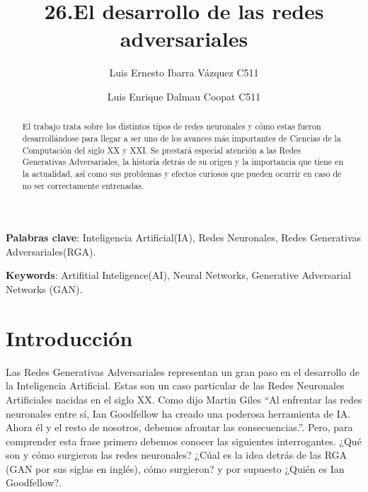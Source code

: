 \documentclass[a4paper]{article}
\begin{document}
\title{26.El desarrollo de las redes adversariales}
\author{Luis Ernesto Ibarra Vázquez C511\and
Luis Enrique Dalmau Coopat C511}
%
%
\renewcommand{\refname}{Bibliografía} 

\maketitle

\begin{abstract}

El trabajo trata sobre los distintos tipos de redes neuronales y cómo estas fueron desarrollándose
para llegar a ser uno de los avances más importantes de Ciencias de la Computación del siglo XX y XXI.
Se prestará especial atención a las Redes Generativas Adversariales, la historia detrás de su origen y
la importancia que tiene en la actualidad, así como sus problemas y efectos curiosos que pueden ocurrir
en caso de no ser correctamente entrenadas. 

\end{abstract}

\textbf{Palabras clave}: Inteligencia Artificial(IA), Redes Neuronales, Redes Generativas Adversariales(RGA).

\textbf{Keywords}: Artifitial Inteligence(AI), Neural Networks, Generative Adversarial Networks (GAN).

\section{Introducción}

Las Redes Generativas Adversariales representan un gran paso en el desarrollo de la Inteligencia
Artificial. Estas son un caso particular de las Redes Neuronales Artificiales nacidas en el siglo XX.
Como dijo Martin Giles 
``Al enfrentar las redes neuronales entre sí, Ian Goodfellow ha creado una poderosa herramienta 
de IA. Ahora él y el resto de nosotros, debemos afrontar las consecuencias.''. Pero, para comprender 
esta frase primero debemos conocer las siguientes interrogantes. ¿Qué son y cómo surgieron las redes neuronales? 
¿Cúal es la idea detrás de las RGA (GAN por sus siglas en inglés), cómo surgieron? y por supuesto ¿Quién es Ian Goodfellow?.
\end{document}
